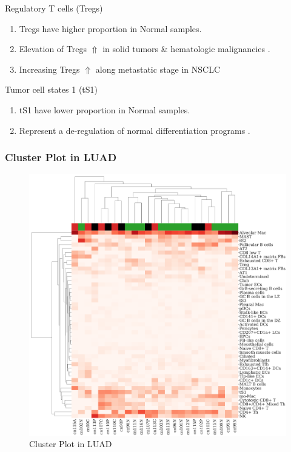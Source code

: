 \documentclass{beamer}
\begin{document}
\begin{frame}[allowframebreaks]
        \begin{block}{Regulatory T cells (Tregs)}
            \begin{enumerate}
                \item Tregs have higher proportion in Normal samples.
                \item Elevation of Tregs $\Uparrow$ in solid tumors \& hematologic malignancies \cite{Tregs-1}.
                \item Increasing Tregs $\Uparrow$ along metastatic stage in NSCLC \cite{Tregs-2}
            \end{enumerate}
        \end{block}

        \begin{block}{Tumor cell states 1 (tS1)}
            \begin{enumerate}
                \item tS1 have lower proportion in Normal samples.
                \item Represent a de-regulation of normal differentiation programs \cite{singlecell1}.
            \end{enumerate}
        \end{block}
    \end{frame}

    \begin{frame}
        \frametitle{Cluster Plot in LUAD}

        \begin{figure}
            \includegraphics[height=0.6 \textheight]{figures/BisqueRNA/clustermap/STAR.ADC.GSE131907.cluster.pdf}
            \caption{Cluster Plot in LUAD}
        \end{figure}
    \end{frame}
\end{document}
